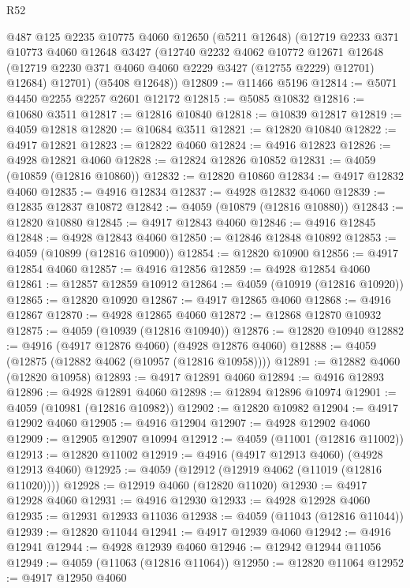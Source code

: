 \begin{lexlean}{R52}
\begin{coremodule}
      @487
      @125
      @2235
      @10775
      @4060
      @12650
      (@5211 @12648)
      (@12719
        @2233
        @371
        @10773
        @4060
        @12648
        @3427
        (@12740
          @2232
          @4062
          @10772
          @12671
          @12648
          (@12719 @2230 @371 @4060 @4060 @2229 @3427 (@12755 @2229) @12701)
          @12684)
        @12701)
      (@5408 @12648))
@12809 := @11466 @5196
@12814 := @5071 @4450 @2255 @2257 @2601 @12172
@12815 := @5085 @10832
@12816 := @10680 @3511
@12817 := @12816 @10840
@12818 := @10839 @12817
@12819 := @4059 @12818
@12820 := @10684 @3511
@12821 := @12820 @10840
@12822 := @4917 @12821
@12823 := @12822 @4060
@12824 := @4916 @12823
@12826 := @4928 @12821 @4060
@12828 := @12824 @12826 @10852
@12831 := @4059 (@10859 (@12816 @10860))
@12832 := @12820 @10860
@12834 := @4917 @12832 @4060
@12835 := @4916 @12834
@12837 := @4928 @12832 @4060
@12839 := @12835 @12837 @10872
@12842 := @4059 (@10879 (@12816 @10880))
@12843 := @12820 @10880
@12845 := @4917 @12843 @4060
@12846 := @4916 @12845
@12848 := @4928 @12843 @4060
@12850 := @12846 @12848 @10892
@12853 := @4059 (@10899 (@12816 @10900))
@12854 := @12820 @10900
@12856 := @4917 @12854 @4060
@12857 := @4916 @12856
@12859 := @4928 @12854 @4060
@12861 := @12857 @12859 @10912
@12864 := @4059 (@10919 (@12816 @10920))
@12865 := @12820 @10920
@12867 := @4917 @12865 @4060
@12868 := @4916 @12867
@12870 := @4928 @12865 @4060
@12872 := @12868 @12870 @10932
@12875 := @4059 (@10939 (@12816 @10940))
@12876 := @12820 @10940
@12882 := @4916 (@4917 @12876 @4060) (@4928 @12876 @4060)
@12888 := @4059 (@12875 (@12882 @4062 (@10957 (@12816 @10958))))
@12891 := @12882 @4060 (@12820 @10958)
@12893 := @4917 @12891 @4060
@12894 := @4916 @12893
@12896 := @4928 @12891 @4060
@12898 := @12894 @12896 @10974
@12901 := @4059 (@10981 (@12816 @10982))
@12902 := @12820 @10982
@12904 := @4917 @12902 @4060
@12905 := @4916 @12904
@12907 := @4928 @12902 @4060
@12909 := @12905 @12907 @10994
@12912 := @4059 (@11001 (@12816 @11002))
@12913 := @12820 @11002
@12919 := @4916 (@4917 @12913 @4060) (@4928 @12913 @4060)
@12925 := @4059 (@12912 (@12919 @4062 (@11019 (@12816 @11020))))
@12928 := @12919 @4060 (@12820 @11020)
@12930 := @4917 @12928 @4060
@12931 := @4916 @12930
@12933 := @4928 @12928 @4060
@12935 := @12931 @12933 @11036
@12938 := @4059 (@11043 (@12816 @11044))
@12939 := @12820 @11044
@12941 := @4917 @12939 @4060
@12942 := @4916 @12941
@12944 := @4928 @12939 @4060
@12946 := @12942 @12944 @11056
@12949 := @4059 (@11063 (@12816 @11064))
@12950 := @12820 @11064
@12952 := @4917 @12950 @4060

\end{coremodule}
\end{lexlean}
